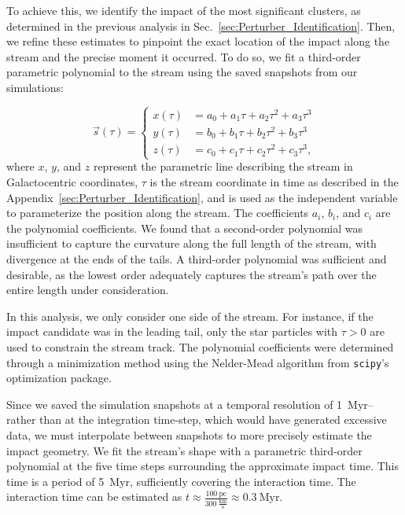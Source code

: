         To achieve this, we identify the impact of the most significant clusters, as determined in the previous analysis in Sec.~\ref{sec:Perturber_Identification}. Then, we refine these estimates to pinpoint the exact location of the impact along the stream and the precise moment it occurred. To do so, we fit a third-order parametric polynomial to the stream using the saved snapshots from our simulations:

        \begin{equation}
            \vec{s}(\tau) = 
            \left\{
            \begin{aligned}
                x(\tau) &= a_0 + a_1 \tau + a_2 \tau^2 + a_3 \tau^3 \\ 
                y(\tau) &= b_0 + b_1 \tau + b_2 \tau^2 + b_3 \tau^3 \\
                z(\tau) &= c_0 + c_1 \tau + c_2 \tau^2 + c_3 \tau^3,
            \end{aligned}
            \right.
        \end{equation}
        where $x$, $y$, and $z$ represent the parametric line describing the stream in Galactocentric coordinates, $\tau$ is the stream coordinate in time as described in the Appendix~\ref{sec:Perturber_Identification}, and is used as the independent variable to parameterize the position along the stream. The coefficients $a_i$, $b_i$, and $c_i$ are the polynomial coefficients. We found that a second-order polynomial was insufficient to capture the curvature along the full length of the stream, with divergence at the ends of the tails. A third-order polynomial was sufficient and desirable, as the lowest order adequately captures the stream's path over the entire length under consideration.

        In this analysis, we only consider one side of the stream. For instance, if the impact candidate was in the leading tail, only the star particles with $\tau > 0$ are used to constrain the stream track. The polynomial coefficients were determined through a minimization method using the Nelder-Mead algorithm from \texttt{scipy}'s optimization package.

        Since we saved the simulation snapshots at a temporal resolution of 1~Myr--rather than at the integration time-step, which would have generated excessive data, we must interpolate between snapshots to more precisely estimate the impact geometry. We fit the stream's shape with a parametric third-order polynomial at the five time steps surrounding the approximate impact time. This time is a period of 5~Myr, sufficiently covering the interaction time. The interaction time can be estimated as $t \approx \frac{100~\text{pc}}{300~\frac{\text{km}}{\text{s}}} \approx 0.3~\text{Myr}$.

